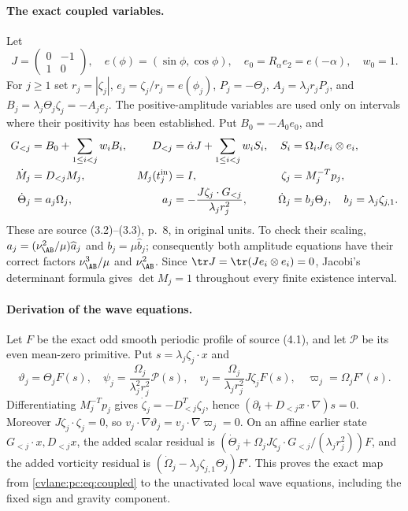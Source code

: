 \paragraph{The exact coupled variables.}
Let
\[
 J=\begin{pmatrix}0&-1\\1&0\end{pmatrix},\quad
 e(\phi)=(\sin\phi,\cos\phi),\quad e_0=R_\alpha e_2=e(-\alpha),\quad w_0=1.
\]
For $j\ge1$ set $r_j=|\zeta_j|$, $e_j=\zeta_j/r_j=e(\phi_j)$, $P_j=-\Theta_j$, $A_j=\lambda_jr_jP_j$, and $B_j=\lambda_j\Theta_j\zeta_j=-A_je_j$. The positive-amplitude variables are used only on intervals where their positivity has been established. Put $B_0=-A_0e_0$, and
\begin{equation}\label{cvlane:pc:eq:coupled}
 \begin{aligned}
 G_{<j}&=B_0+\sum_{1\le i<j}w_iB_i,
 &D_{<j}&=\dot\alpha J+\sum_{1\le i<j}w_iS_i,
 &S_i&=\Omega_iJe_i\otimes e_i,\\
 \dot M_j&=D_{<j}M_j,
 &M_j(t_j^{\rm in})&=I,
 &\zeta_j&=M_j^{-T}p_j,\\
 \dot\Theta_j&=a_j\Omega_j,
 &a_j&=-\frac{J\zeta_j\cdot G_{<j}}{\lambda_jr_j^2},
 &\dot\Omega_j&=b_j\Theta_j,\quad b_j=\lambda_j\zeta_{j,1}.
 \end{aligned}
\end{equation}
These are source (3.2)--(3.3), p.~8, in original units. To check their scaling, $a_j=(\nu_{\AB}^2/\mu)\widehat a_j$ and $b_j=\mu\widehat b_j$; consequently both amplitude equations have their correct factors $\nu_{\AB}^3/\mu$ and $\nu_{\AB}^2$. Since $\tr J=\tr(Je_i\otimes e_i)=0$, Jacobi's determinant formula gives $\det M_j=1$ throughout every finite existence interval.

\paragraph{Derivation of the wave equations.}
Let $F$ be the exact odd smooth periodic profile of source (4.1), and let $\mathcal P$ be its even mean-zero primitive. Put $s=\lambda_j\zeta_j\cdot x$ and
\[
 \vartheta_j=\Theta_jF(s),\quad
 \psi_j=\frac{\Omega_j}{\lambda_j^2r_j^2}\mathcal P(s),\quad
 v_j=\frac{\Omega_j}{\lambda_jr_j^2}J\zeta_j F(s),\quad
 \varpi_j=\Omega_jF'(s).
\]
Differentiating $M_j^{-T}p_j$ gives $\dot\zeta_j=-D_{<j}^T\zeta_j$, hence $(\partial_t+D_{<j}x\cdot\nabla)s=0$. Moreover $J\zeta_j\cdot\zeta_j=0$, so $v_j\cdot\nabla\vartheta_j=v_j\cdot\nabla\varpi_j=0$. On an affine earlier state $G_{<j}\cdot x,D_{<j}x$, the added scalar residual is $(\dot\Theta_j+\Omega_jJ\zeta_j\cdot G_{<j}/(\lambda_jr_j^2))F$, and the added vorticity residual is $(\dot\Omega_j-\lambda_j\zeta_{j,1}\Theta_j)F'$. This proves the exact map from \eqref{cvlane:pc:eq:coupled} to the unactivated local wave equations, including the fixed sign and gravity component.

